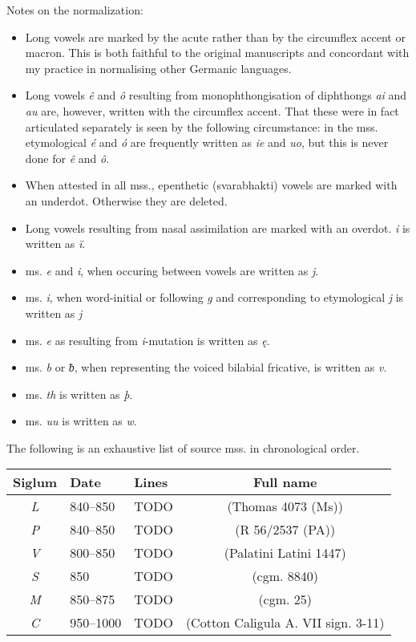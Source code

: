 Notes on the normalization:
  \begin{itemize}
    \item Long vowels are marked by the acute rather than by the circumflex accent or macron. This is both faithful to the original manuscripts and concordant with my practice in normalising other Germanic languages.
    \item Long vowels \emph{ê} and \emph{ô} resulting from monophthongisation of diphthongs \emph{ai} and \emph{au} are, however, written with the circumflex accent. That these were in fact articulated separately is seen by the following circumstance: in the mss. etymological \emph{é} and \emph{ó} are frequently written as \emph{ie} and \emph{uo}, but this is never done for \emph{ê} and \emph{ô}.
    \item When attested in all mss., epenthetic (svarabhakti) vowels are marked with an underdot. Otherwise they are deleted.
    \item Long vowels resulting from nasal assimilation are marked with an overdot. \emph{i} is written as \emph{ï}.
    \item ms. \emph{e} and \emph{i}, when occuring between vowels are written as \emph{j}.
    \item ms. \emph{i}, when word-initial or following \emph{g} and corresponding to etymological \emph{j} is written as \emph{j}
    \item ms. \emph{e} as resulting from \emph{i}-mutation is written as \emph{ę}.
    \item ms. \emph{b} or \emph{ƀ}, when representing the voiced bilabial fricative, is written as \emph{v}.
    \item ms. \emph{th} is written as \emph{þ}.
    \item ms. \emph{uu} is written as \emph{w}.
  \end{itemize}

The following is an exhaustive list of source mss. in chronological order.

\begin{longtabu} to \textwidth {|c l l c|}
	\hline
	Siglum & Date & Lines & Full name \\
	\hline\hline\endhead
  \emph{L} & 840–850 & TODO & (Thomas 4073 (Ms)) \\
  \emph{P} & 840–850 & TODO & (R 56/2537 (PA)) \\
  \emph{V} & 800–850 & TODO & (Palatini Latini 1447) \\
  \emph{S} & 850 & TODO & (cgm. 8840) \\
  \emph{M} & 850–875 & TODO & (cgm. 25) \\
  \emph{C} & 950–1000 & TODO & (Cotton Caligula A. VII sign. 3-11) \\
	\hline
\end{longtabu}

